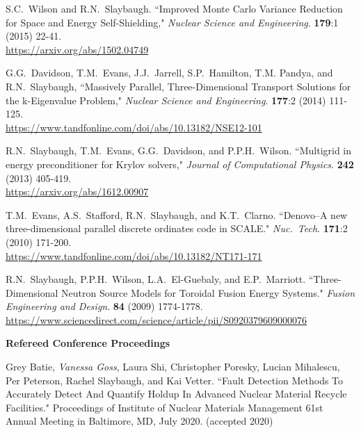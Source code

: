 \begin{bibsection}
\item S.C.\ Wilson and R.N.\ Slaybaugh. ``Improved Monte Carlo Variance Reduction for Space and Energy Self-Shielding," \textit{Nuclear Science and Engineering}. \textbf{179}:1 (2015) 22-41.\\
\url{https://arxiv.org/abs/1502.04749}

\item G.G.\ Davidson, T.M.\ Evans, J.J.\ Jarrell, S.P.\ Hamilton, T.M. Pandya, and R.N.\ Slaybaugh, ``Massively Parallel, Three-Dimensional Transport Solutions for the k-Eigenvalue Problem," \textit{Nuclear Science and Engineering}. \textbf{177}:2 (2014) 111-125.\\
\url{https://www.tandfonline.com/doi/abs/10.13182/NSE12-101}

\item R.N.\ Slaybaugh, T.M.\ Evans, G.G.\ Davidson, and P.P.H.\ Wilson. ``Multigrid in energy preconditioner for Krylov solvers," \textit{Journal of Computational Physics}. \textbf{242} (2013) 405-419.\\
\url{https://arxiv.org/abs/1612.00907}

\item T.M.\ Evans, A.S.\ Stafford, R.N.\ Slaybaugh, and K.T.\ Clarno. ``Denovo--A new three-dimensional parallel discrete ordinates code in SCALE." \textit{Nuc.\ Tech}. \textbf{171}:2 (2010) 171-200.\\
\url{https://www.tandfonline.com/doi/abs/10.13182/NT171-171}

\item R.N.\ Slaybaugh, P.P.H.\ Wilson, L.A.\ El-Guebaly, and E.P.\ Marriott. ``Three-Dimensional Neutron Source Models for Toroidal Fusion Energy Systems." \textit{Fusion Engineering and Design}. \textbf{84} (2009) 1774-1778.\\
\url{https://www.sciencedirect.com/science/article/pii/S0920379609000076} 

\item \textbf{Refereed Conference Proceedings}
\item Grey Batie, \textit{Vanessa Goss}, Laura Shi, Christopher Poresky, Lucian
Mihalescu, Per Peterson, Rachel Slaybaugh, and Kai Vetter. ``Fault Detection Methods To Accurately Detect And Quantify Holdup In Advanced Nuclear Material Recycle Facilities."  Proceedings of Institute
of Nuclear Materials Management 61st Annual Meeting in Baltimore, MD, July 2020.
(accepted 2020)


\end{bibsection}
